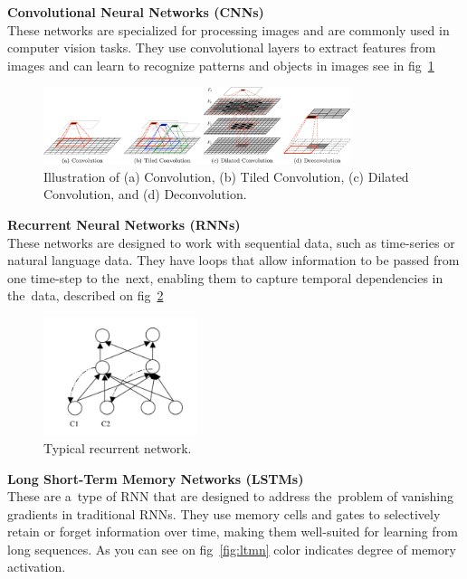 \textbf{Convolutional Neural Networks (CNNs)}\\
These networks are specialized for processing images and are commonly used in computer vision tasks. They use convolutional layers to extract features from images and can learn to recognize patterns and objects in images see in fig~\ref{fig:cn}
    \begin{center}
        \begin{figure}[!ht]
            \centering
            \includegraphics[width=0.8\textwidth]{figures/cn}
            \caption{Illustration of (a) Convolution, (b) Tiled Convolution, (c) Dilated Convolution, and (d)
                Deconvolution. \cite{GU2018354}}
            \label{fig:cn}
        \end{figure}
    \end{center}
\textbf{Recurrent Neural Networks (RNNs)}\\
These networks are designed to work with sequential data, such as time-series or natural language data. They have loops that allow information to be passed from one time-step to the~next, enabling them to capture temporal dependencies in the~data, described on fig~\ref{fig:rn}
    \begin{center}
        \begin{figure}[!ht]
            \centering
            \includegraphics[width=0.4\textwidth]{figures/rn}
            \caption{Typical recurrent network. \cite{medsker2001recurrent}}
            \label{fig:rn}
        \end{figure}
    \end{center}
\textbf{Long Short-Term Memory Networks (LSTMs)}\\
These are a~type of RNN that are designed to address the~problem of vanishing gradients in traditional RNNs. They use memory cells and gates to selectively retain or forget information over time, making them well-suited for learning from long sequences. As you can see on fig~\ref{fig:ltmn} color indicates degree of memory activation.
